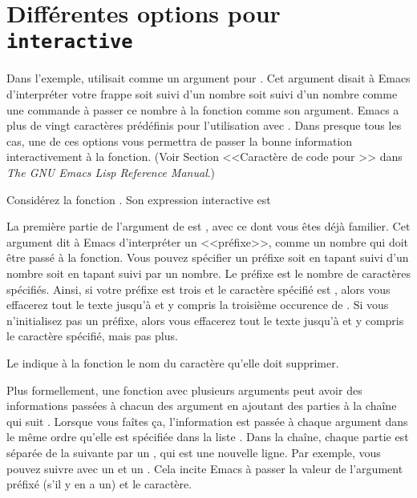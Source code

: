 \section{Différentes options pour \texttt{interactive}}
Dans l'exemple,  utilisait  comme un
argument pour . Cet argument disait à Emacs
d'interpréter votre frappe soit  suivi d'un nombre soit
 suivi d'un nombre comme une commande à passer ce nombre à la
fonction comme son argument. Emacs a plus de vingt caractères
prédéfinis pour l'utilisation avec . Dans presque tous
les cas, une de ces options vous permettra de passer la bonne
information interactivement à la fonction. (Voir Section <<Caractère
de code pour >> dans \textit{The GNU Emacs Lisp
  Reference Manual}.)
\begin{center}
  Considérez la fonction . Son expression interactive
  est

\end{center}

La première partie de l'argument de  est ,
avec ce dont vous êtes déjà familier. Cet argument dit à Emacs
d'interpréter un <<préfixe>>, comme un nombre qui doit être passé à la
fonction. Vous pouvez spécifier un préfixe soit en tapant 
suivi d'un nombre soit en tapant  suivi par un nombre. Le
préfixe est le nombre de caractères spécifiés. Ainsi, si votre préfixe
est trois et le caractère spécifié est , alors vous effacerez
tout le texte jusqu'à et y compris la troisième occurence de
. Si vous n'initialisez pas un préfixe, alors vous effacerez
tout le texte jusqu'à et y compris le caractère spécifié, mais pas
plus. 

Le  indique à la fonction le nom du caractère qu'elle doit
supprimer.

Plus formellement, une fonction avec plusieurs arguments peut avoir
des informations passées à chacun des argument en ajoutant des
parties à la chaîne qui suit . Lorsque vous faîtes ça,
l'information est passée à chaque argument dans le même ordre qu'elle
est spécifiée dans la liste . Dans la chaîne, chaque
partie est séparée de la suivante par un , qui
est une nouvelle ligne. Par exemple, vous pouvez suivre  avec
un  et un . Cela incite
Emacs à passer la valeur de l'argument préfixé (s'il y en a un) et le
caractère. 

